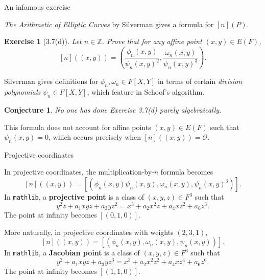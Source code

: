 \documentclass[10pt]{beamer}
\newtheorem{conjecture}{Conjecture}
\newtheorem{exercise}{Exercise}
\begin{document}
\begin{frame}[t]{An infamous exercise}

\emph{The Arithmetic of Elliptic Curves} by Silverman gives a formula for $ [n](P) $.

\begin{exercise}[3.7(d)]
Let $ n \in \mathbb{Z} $. Prove that for any affine point $ (x, y) \in E(F) $,
$$ [n]((x, y)) = \left(\dfrac{\phi_n(x, y)}{\psi_n(x, y)^2}, \dfrac{\omega_n(x, y)}{\psi_n(x, y)^3}\right). $$
\end{exercise}

\pagebreak

Silverman gives definitions for $ \phi_n, \omega_n \in F[X, Y] $ in terms of certain \emph{division polynomials} $ \psi_n \in F[X, Y] $, which feature in Schoof's algorithm.

\pause

\vspace{0.5cm}

\begin{conjecture}
No one has done Exercise 3.7(d) purely algebraically.
\end{conjecture}

\pause

\vspace{0.5cm} This formula does not account for affine points $ (x, y) \in E(F) $ such that $ \psi_n(x, y) = 0 $, which occurs precisely when $ [n]((x, y)) = \mathcal{O} $.

\end{frame}

\begin{frame}[t]{Projective coordinates}

In projective coordinates, the multiplication-by-$ n $ formula becomes
$$ [n]((x, y)) = [(\phi_n(x, y)\psi_n(x, y), \omega_n(x, y), \psi_n(x, y)^3)]. $$
In \texttt{mathlib}, a \textbf{projective point} is a class of $ (x, y, z) \in F^3 $ such that
$$ y^2z + a_1xyz + a_3yz^2 = x^3 + a_2x^2z + a_4xz^2 + a_6z^3. $$
The point at infinity becomes $ [(0, 1, 0)] $.

\pause

\vspace{0.5cm} More naturally, in projective coordinates with weights $ (2, 3, 1) $,
$$ [n]((x, y)) = [(\phi_n(x, y), \omega_n(x, y), \psi_n(x, y))]. $$
In \texttt{mathlib}, a \textbf{Jacobian point} is a class of $ (x, y, z) \in F^3 $ such that
$$ y^2 + a_1xyz + a_3yz^3 = x^3 + a_2x^2z^2 + a_4xz^4 + a_6z^6. $$
The point at infinity becomes $ [(1, 1, 0)] $.

\end{frame}
\end{document}
